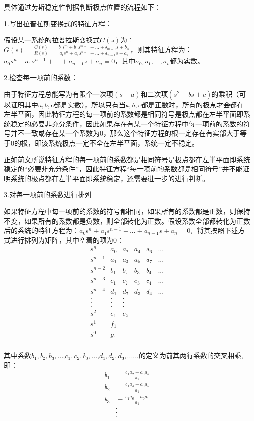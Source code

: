 \documentclass{article}
\numberwithin{equation}{section}
\numberwithin{figure}{section}
\begin{document}
具体通过劳斯稳定性判据判断极点位置的流程如下：

1.写出拉普拉斯变换式的特征方程：

假设某一系统的拉普拉斯变换式$G(s)$为：$G(s)=\frac{C(s)}{R(s)}=\frac{b_0s^m+b_1s^{m-1}+...+b_{m-1}s+b_m}{a_0s^n+a_1s^{n-1}+...+a_{n-1}s+a_n}$，则其特征方程为：$a_0s^n+a_1s^{n-1}+...+a_{n-1}s+a_n=0$，其中$a_0,a_1,...,a_n$都为实数。

2.检查每一项前的系数：

由于特征方程总能写为有限个一次项$(s+a)$和二次项$(s^2+bs+c)$的乘积（可以证明其中$a,b,c$都是实数），所以只有当$a,b,c$都是正数时，所有的极点才会都在左半平面，因此特征方程的每一项前的系数都是相同符号是极点都在左半平面即系统稳定的必要非充分条件，因此如果存在有某一个特征方程中每一项前的系数的符号并不一致或存在某一个系数为0，那么这个特征方程的根一定存在有实部大于等于0的根，即该系统极点一定不全在左半平面，系统一定不稳定。

正如前文所说特征方程的每一项前的系数都是相同符号是极点都在左半平面即系统稳定的“必要非充分条件”，因此特征方程“每一项前的系数都是相同符号”并不能证明系统的极点都在左半平面即系统稳定，还需要进一步的进行判断。

3.对每一项前的系数进行排列

如果特征方程中每一项前的系数的符号都相同，如果所有的系数都是正数，则保持不变，如果所有的系数都是负数，则全部转化为正数。假设系数全部都转化为正数后的系统的特征方程为：$a_0s^n+a_1s^{n-1}+...+a_{n-1}s+a_n=0$，将其按照下述方式进行排列为矩阵，其中空着的项为0：
\begin{equation}
    \begin{matrix}
        s^n&a_0&a_2&a_4&a_6&...\\
        s^{n-1}&a_1&a_3&a_5&a_7&...\\
        s^{n-2}&b_1&b_2&b_3&b_4&...\\
        s^{n-3}&c_1&c_2&c_3&c_4&...\\
        s^{n-4}&d_1&d_2&d_3&d_4&...\\
        .&.&.\\
        .&.&.\\
        .&.&.\\
        s^{2}&e_1&e_2\\
        s^{1}&f_1\\
        s^{0}&g_1\\
    \end{matrix}\label{RouthStabilityMatrix}
\end{equation}

其中系数$b_1,b_2,b_3,...$,$c_1,c_2,b_3,...$,$d_1,d_2,d_3,...$...的定义为前其两行系数的交叉相乘,即：
\begin{equation}
    \begin{split}
        b_1&=\frac{a_1a_2-a_0a_3}{a_1}\\
        b_2&=\frac{a_1a_4-a_0a_5}{a_1}\\
        b_3&=\frac{a_1a_6-a_0a_7}{a_1}\\
        &.\\
        &.\\
        &.
    \end{split}
\end{equation}
\end{document}
